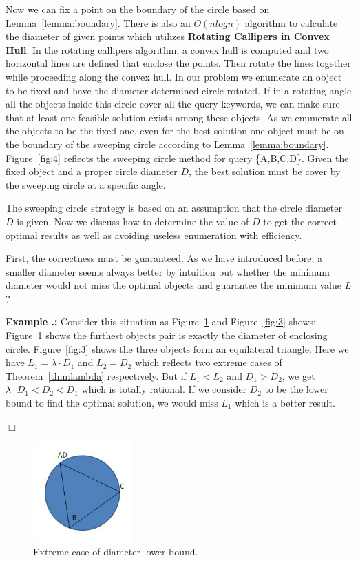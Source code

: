 \documentclass{sig-alternate}
\newcounter{example}[section]
\renewcommand{\theexample}{\nthesection.\arabic{example}}
\newenvironment{example}{
    \refstepcounter{example}
    {\vspace{1ex} \noindent\bf  Example  \theexample:}}{
    \eop\vspace{1ex}} %
\newcommand{\nthesection}{\arabic{section}}
\newcommand{\eop}{\hspace*{\fill}\mbox{$\Box$}}
\begin{document}
Now we can fix a point on the boundary of the circle based on Lemma~\ref{lemma:boundary}.
There is also an $O(nlogn)$ algorithm to calculate the diameter of given points 
which utilizes \textbf{Rotating Callipers in Convex Hull}. In the rotating callipers
algorithm, a convex hull is computed and two horizontal lines are defined
that enclose the points. Then rotate the lines together while proceeding along the
convex hull. In our problem we enumerate an object to be fixed and have the
diameter-determined circle rotated. If in a rotating angle all the objects inside
this circle cover all the query keywords, we can make sure that at least one feasible solution
exists among these objects. As we enumerate all the objects to be the fixed
one, even for the best solution one object must be on the boundary of the sweeping circle
according to Lemma~\ref{lemma:boundary}. Figure~\ref{fig:4} reflects the sweeping circle method
for query \{A,B,C,D\}.
Given the fixed object and a proper circle diameter $D$,
the best solution must be cover by the sweeping circle at a specific angle.
%

The sweeping circle strategy is based on an assumption that the circle diameter $D$
is given. Now we discuss how to determine the value of $D$ to get the
correct optimal results as well as avoiding useless enumeration with efficiency.
%

First, the correctness must be guaranteed. As we have introduced before, a smaller
diameter seems always better by intuition but whether the minimum diameter would 
not miss the optimal objects and guarantee the minimum value $L$?
%

\begin{example}\label{ex:counter}
Consider this situation as Figure~\ref{fig:2} and Figure~\ref{fig:3} shows:
Figure~\ref{fig:2} shows the furthest objects pair is exactly the diameter
of enclosing circle. Figure~\ref{fig:3} shows the three objects form an equilateral triangle.
Here we have $L_1 = \lambda\cdot D_1$ and $L_2 = D_2$ which reflects two extreme cases
of Theorem~\ref{thm:lambda} respectively. But if $L_1 < L_2$ and $D_1 > D_2$, we get
$\lambda\cdot D_1 < D_2 < D_1$ which is totally rational.
If we consider $D_2$ to be the lower bound to find the optimal solution,
we would miss $L_1$ which is a better result.
\end{example}
%

\begin{figure}\label{fig:2}
\begin{center}
\includegraphics[width=1.5in]{figure/fig2}
\caption{Extreme case of diameter lower bound.}
\end{center}
\end{figure}
\end{document}
